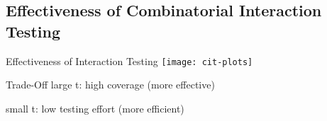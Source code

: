 
\subsection{Effectiveness of Combinatorial Interaction Testing}
\begin{frame}{\myframetitle}
	\begin{mycolumns}[forget]
		\begin{exampletight}{Effectiveness of Interaction Testing }
			\texttt{[image: cit-plots]}
		\end{exampletight}
	\mynextcolumn
		\begin{note}{Trade-Off}
			large t: high coverage (more effective)
			
			small t: low testing effort (more efficient)
		\end{note}
	\end{mycolumns}
\end{frame}
